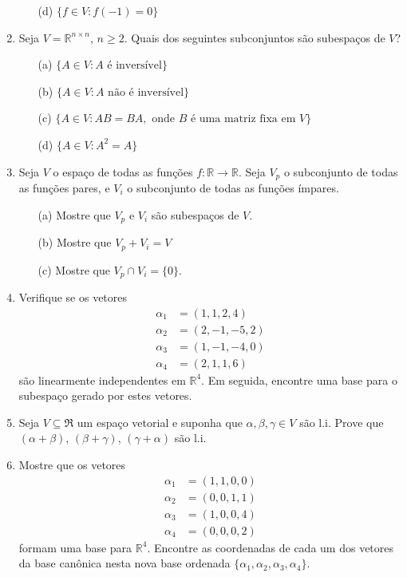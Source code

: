 \documentclass[12pt]{article}
\begin{document}
\begin{enumerate}
\begin{itemize}
  \item[(d)] $\{f \in V : f(-1)=0\}$ 
  \end{itemize}
\item Seja $V = {\mathbb{R}}^{n\times n}$, $n\geq 2$. Quais dos seguintes subconjuntos são subespaços de $V$?
  \begin{itemize}
  \item[(a)] $\{A \in V : A \mbox{ é inversível}\}$ 
  \item[(b)] $\{A \in V : A \mbox{ não é inversível}\}$ 
  \item[(c)] $\{A \in V : AB=BA, \mbox{ onde } B \mbox{ é uma matriz fixa em } V\}$ 
  \item[(d)] $\{A \in V : A^2=A\}$ 
  \end{itemize}
\item Seja $V$ o espaço de todas as funções $f:\mathbb{R} \rightarrow \mathbb{R}$. Seja $V_p$ o subconjunto de todas as funções pares, e $V_i$ o subconjunto de todas as funções ímpares.
  \begin{itemize}
  \item[(a)] Mostre que $V_p$ e $V_i$ são subespaços de $V$.
  \item[(b)] Mostre que $V_p+V_i=V$
  \item[(c)] Mostre que $V_p\cap V_i = \{0\}$.
  \end{itemize}
\item Verifique se os vetores
  \begin{align*}
    \alpha_1 &= (1,1,2,4) \\
    \alpha_2 &= (2,-1,-5,2)\\
    \alpha_3 &= (1,-1,-4,0)\\
    \alpha_4 &= (2,1,1,6)
  \end{align*}
  são linearmente independentes em ${\mathbb{R}}^4$. Em seguida, encontre uma base para o subespaço gerado por estes vetores.
\item Seja $V \subseteq \Re$ um espaço vetorial e suponha que $\alpha, \beta, \gamma \in V$ são l.i. Prove que $(\alpha + \beta)$, $(\beta +\gamma)$, $(\gamma +\alpha)$ são l.i.
\item Mostre que os vetores 
  \begin{align*}
    \alpha_1 &= (1,1,0,0)\\
    \alpha_2 &= (0,0,1,1)\\
    \alpha_3 &= (1,0,0,4)\\
    \alpha_4 &= (0,0,0,2)
  \end{align*}
  formam uma base para ${\mathbb{R}}^4$. Encontre as coordenadas de cada um dos vetores da base canônica nesta nova base ordenada $\{ \alpha_1,\alpha_2,\alpha_3,\alpha_4\}$.

\end{enumerate}
\end{document}
